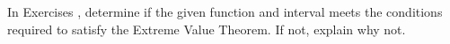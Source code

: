 {\noindent In Exercises}
{, determine if the given function and interval meets the conditions required to satisfy the Extreme Value Theorem.  If not, explain why not.}
